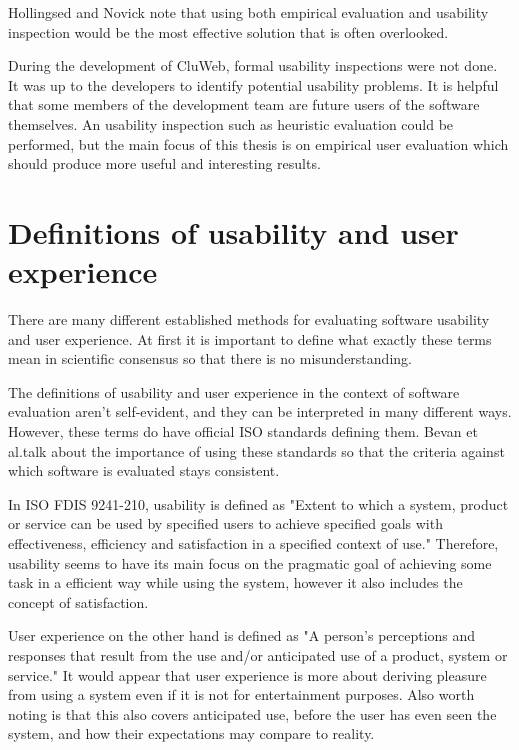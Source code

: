 Hollingsed and Novick note that using both empirical evaluation and usability inspection would be the most effective solution that is often overlooked. \cite{hollingsed2007usability}

During the development of CluWeb, formal usability inspections were not done. It was up to the developers to identify potential usability problems. It is helpful that some members of the development team are future users of the software themselves. An usability inspection such as heuristic evaluation could be performed, but the main focus of this thesis is on empirical user evaluation which should produce more useful and interesting results.

\section{Definitions of usability and user experience}\label{definitions_section}

There are many different established methods for evaluating software usability and user experience. At first it is important to define what exactly these terms mean in scientific consensus so that there is no misunderstanding.

The definitions of usability and user experience in the context of software evaluation aren't self-evident, and they can be interpreted in many different ways. However, these terms do have official ISO standards defining them. Bevan et al.talk about the importance of using these standards so that the criteria against which software is evaluated stays consistent. \cite{bevanstandard}

In  ISO FDIS 9241-210, usability is defined as "Extent to which  a system, product or service can be used by specified users to achieve specified goals with effectiveness, efficiency and satisfaction in a specified context of use." Therefore, usability seems to have its main focus on the pragmatic goal of achieving some task in a efficient way while using the system, however it also includes the concept of satisfaction.

User experience on the other hand is defined as "A person's perceptions and responses that result from the use and/or anticipated use of a product, system or service." It would appear that user experience is more about deriving pleasure from using a system even if it is not for entertainment purposes. Also worth noting is that this also covers anticipated use, before the user has even seen the system, and how their expectations may compare to reality.

